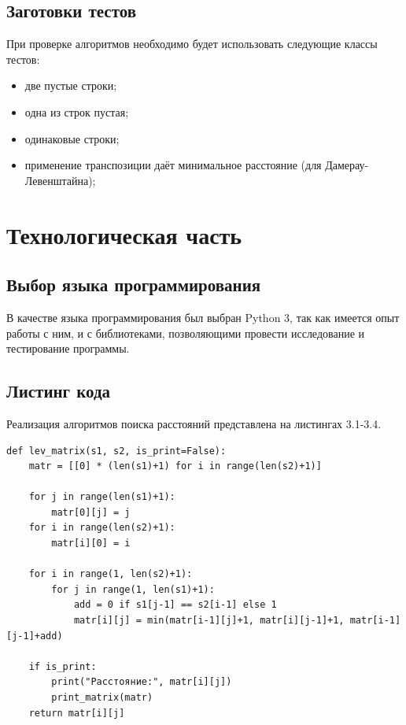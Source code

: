 \documentclass[10pt,a4paper]{report}
\begin{document}
	\section{Заготовки тестов}
	При проверке алгоритмов необходимо будет использовать следующие классы тестов:
	\begin{itemize}
		\item две пустые строки;
		\item одна из строк пустая;
		\item одинаковые строки;
		\item применение транспозиции даёт минимальное расстояние (для Дамерау-Левенштайна);
	\end{itemize}



	\newpage
	\chapter{Технологическая  часть}
	
	\section{Выбор языка программирования}
	В качестве языка программирования был выбран Python 3, так как имеется опыт работы с ним, и с библиотеками, позволяющими провести исследование и тестирование программы.
	
	\section{Листинг кода}
	Реализация алгоритмов поиска расстояний представлена на листингах 3.1-3.4.
	
	\begin{lstlisting}[caption = Функция нахождения расстояния Левенштейна матричным методом.]
def lev_matrix(s1, s2, is_print=False):
	matr = [[0] * (len(s1)+1) for i in range(len(s2)+1)]
	
	for j in range(len(s1)+1):
		matr[0][j] = j
	for i in range(len(s2)+1):
		matr[i][0] = i
	
	for i in range(1, len(s2)+1):
		for j in range(1, len(s1)+1):
			add = 0 if s1[j-1] == s2[i-1] else 1
			matr[i][j] = min(matr[i-1][j]+1, matr[i][j-1]+1, matr[i-1][j-1]+add)
	
	if is_print:
		print("Расстояние:", matr[i][j])
		print_matrix(matr)
	return matr[i][j]
	\end{lstlisting}
	
\end{document}
